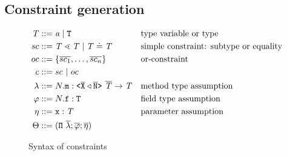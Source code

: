 \documentclass[a4paper,USenglish,cleveref, autoref, thm-restate]{lipics-v2021}
\begin{document}
\subsection{Constraint generation}
\label{sec:fjtype}
\begin{figure}[tp]
  \begin{align*}
    \mathit{T} &::= \mathit{ a } \mid {\tt T} && \text{type variable or type}\\
    sc &::= \mathit{T} \lessdot \mathit{T} \mid \mathit{T} \doteq
        \mathit{T} && \text{simple constraint: subtype or equality}\\
    oc{} &::= \{ \overline{sc_1}, \ldots, \overline{sc_n} \} && \text{or-constraint}\\
    \mathit{c} &::= sc\ |\ oc \\
    \mathtt{\lambda} &::= N.\texttt{m} : \mathtt{ \texttt{<} \overline{\tt X}
                        \triangleleft \overline{\tt N} \texttt{>} }\ \overline{\tt \mathit{T}} \to \mathit{T}  &&
                                                                \text{method
                                                                type assumption}\\
    \mathtt{\varphi} &::= N.\texttt{f} : \texttt{T} && \text{field type assumption}\\
    \mathtt{\eta} &::= \texttt{x} : \mathit{T} && \text{parameter assumption}\\
    \Theta &::= ({\tt \Pi}\ \overline{\mathtt{\lambda}} ; \overline{\mathtt{\varphi}}; \overline{\mathtt{\eta}}) 
  \end{align*}
  \caption{Syntax of constraints}
  \label{fig:syntax-constraints}
\end{figure}
\end{document}
